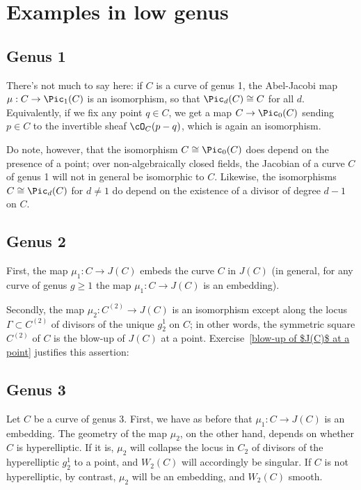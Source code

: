 \section{Examples in low genus}

\subsection{Genus 1} 

There's not much to say here: if $C$ is a curve of genus 1, the Abel-Jacobi map $\mu : C \to \Pic_1(C)$ is an isomorphism, so that $\Pic_d(C) \cong C$ for all $d$. Equivalently, if we fix any point $q \in C$, we get a map $C \to \Pic_0(C)$ sending $p \in C$ to the invertible sheaf $\cO_C(p-q)$, which is again an isomorphism.

Do note, however, that the isomorphism $C \cong \Pic_0(C)$ does depend on the presence of a point; over non-algebraically closed fields, the Jacobian of a curve $C$ of genus 1 will not in general be isomorphic to $C$. Likewise, the isomorphisms $C \cong \Pic_d(C)$
for $d \neq 1$ do depend on the existence of a divisor of degree $d-1$ on $C$.

\subsection{Genus 2}

First, the map $\mu_1 : C \to J(C)$ embeds the curve $C$ in $J(C)$ (in general, for any curve of genus $g \geq 1$ the map $\mu_1 : C \to J(C)$ is an embedding). 

Secondly, the map $\mu_2 : C^{(2)} \to J(C)$ is an isomorphism except along the locus $\Gamma \subset  C^{(2)} $ of divisors of the unique $g^1_2$ on $C$; in other words, the symmetric square $ C^{(2)} $ of $C$ is the blow-up of $J(C)$ at a point. Exercise~\ref{blow-up of $J(C)$ at a point} justifies this assertion:


\subsection{Genus 3}

Let $C$ be a curve of genus 3. First, we have as before that $\mu_1 : C \to J(C)$ is an embedding. The geometry of the map $\mu_2$, on the other hand, depends on whether  $C$ is hyperelliptic. If it is, $\mu_2$ will collapse the locus in $C_2$ of divisors of the hyperelliptic $g^1_2$ to a point, and $W_2(C)$ will accordingly be singular. If $C$ is not hyperelliptic, by contrast, $\mu_2$ will be an embedding, and $W_2(C)$ smooth.

